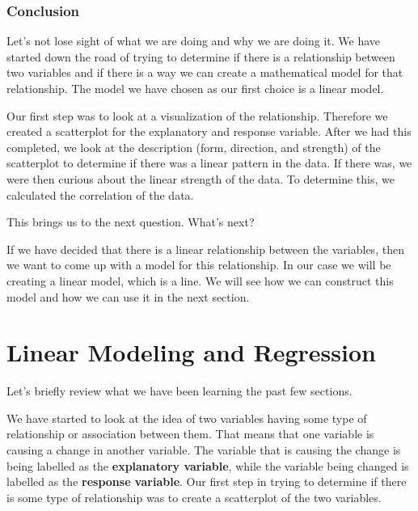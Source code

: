 \documentclass[
  letterpaper,
  DIV=11,
  numbers=noendperiod]{scrreprt}
\begin{document}
\subsection*{Conclusion}\label{conclusion-2}

Let's not lose sight of what we are doing and why we are doing it. We
have started down the road of trying to determine if there is a
relationship between two variables and if there is a way we can create a
mathematical model for that relationship. The model we have chosen as
our first choice is a linear model.

Our first step was to look at a visualization of the relationship.
Therefore we created a scatterplot for the explanatory and response
variable. After we had this completed, we look at the description (form,
direction, and strength) of the scatterplot to determine if there was a
linear pattern in the data. If there was, we were then curious about the
linear strength of the data. To determine this, we calculated the
correlation of the data.

This brings us to the next question. What's next?

If we have decided that there is a linear relationship between the
variables, then we want to come up with a model for this relationship.
In our case we will be creating a linear model, which is a line. We will
see how we can construct this model and how we can use it in the next
section.


\chapter*{Linear Modeling and
Regression}\label{linear-modeling-and-regression}


Let's briefly review what we have been learning the past few sections.

We have started to look at the idea of two variables having some type of
relationship or association between them. That means that one variable
is causing a change in another variable. The variable that is causing
the change is being labelled as the \textbf{explanatory variable}, while
the variable being changed is labelled as the \textbf{response
variable}. Our first step in trying to determine if there is some type
of relationship was to create a scatterplot of the two variables.
\end{document}
